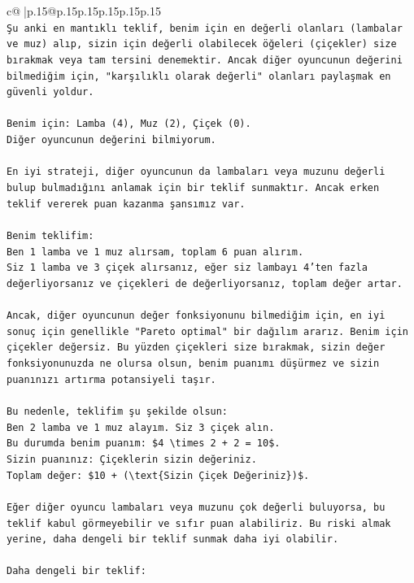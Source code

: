 \documentclass{article}
\begin{document}
{\begin{supertabular}{c@{$\;$}|p{.15\linewidth}@{}p{.15\linewidth}p{.15\linewidth}p{.15\linewidth}p{.15\linewidth}p{.15\linewidth}}
{{{\\ 
\texttt{Şu anki en mantıklı teklif, benim için en değerli olanları (lambalar ve muz) alıp, sizin için değerli olabilecek öğeleri (çiçekler) size bırakmak veya tam tersini denemektir. Ancak diğer oyuncunun değerini bilmediğim için, "karşılıklı olarak değerli" olanları paylaşmak en güvenli yoldur.} \\
\\ 
\texttt{Benim için: Lamba (4), Muz (2), Çiçek (0).} \\
\texttt{Diğer oyuncunun değerini bilmiyorum.} \\
\\ 
\texttt{En iyi strateji, diğer oyuncunun da lambaları veya muzunu değerli bulup bulmadığını anlamak için bir teklif sunmaktır. Ancak erken teklif vererek puan kazanma şansımız var.} \\
\\ 
\texttt{Benim teklifim:} \\
\texttt{Ben 1 lamba ve 1 muz alırsam, toplam 6 puan alırım.} \\
\texttt{Siz 1 lamba ve 3 çiçek alırsanız, eğer siz lambayı 4'ten fazla değerliyorsanız ve çiçekleri de değerliyorsanız, toplam değer artar.} \\
\\ 
\texttt{Ancak, diğer oyuncunun değer fonksiyonunu bilmediğim için, en iyi sonuç için genellikle "Pareto optimal" bir dağılım ararız. Benim için çiçekler değersiz. Bu yüzden çiçekleri size bırakmak, sizin değer fonksiyonunuzda ne olursa olsun, benim puanımı düşürmez ve sizin puanınızı artırma potansiyeli taşır.} \\
\\ 
\texttt{Bu nedenle, teklifim şu şekilde olsun:} \\
\texttt{Ben 2 lamba ve 1 muz alayım. Siz 3 çiçek alın.} \\
\texttt{Bu durumda benim puanım: \$4 \textbackslash{}times 2 + 2 = 10\$.} \\
\texttt{Sizin puanınız: Çiçeklerin sizin değeriniz.} \\
\texttt{Toplam değer: \$10 + (\textbackslash{}text\{Sizin Çiçek Değeriniz\})\$.} \\
\\ 
\texttt{Eğer diğer oyuncu lambaları veya muzunu çok değerli buluyorsa, bu teklif kabul görmeyebilir ve sıfır puan alabiliriz. Bu riski almak yerine, daha dengeli bir teklif sunmak daha iyi olabilir.} \\
\\ 
\texttt{Daha dengeli bir teklif:} \\
}}}
\end{supertabular}}
\end{document}
